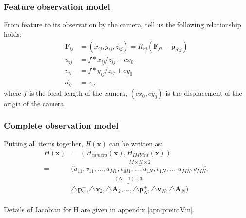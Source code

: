 \documentclass[12pt]{article}   %
\begin{document}
\subsubsection{Feature observation model}
From feature to its observation by the camera, \cite{multipleViewGeometry} tell us the following relationship holds:
\begin{align}
\textbf{F}_{ij} &= (x_{ij}, y_{ij}, z_{ij}) = R_{cj} (\textbf{F}_{fi} - \textbf{p}_{c0j}) \label{formu:pij} \\
u_{ij} &= f * x_{ij} / z_{ij} + cx_0 \label{formu:uij} \\
v_{ij} &= f * y_{ij} / z_{ij} + cy_0 \label{formu:vij} \\
d_{ij} &= z_{ij} \label{formu:dij}
\end{align}
where $f$ is the focal length of the camera, $(cx_0, cy_0)$ is the displacement of the origin of the camera.

\subsubsection{Complete observation model}
Putting all items together, $H(\textbf{x})$ can be written as:
\begin{align} %
H(\textbf{x}) &= (H_{camera}(\textbf{x}), H_{IMUint}(\textbf{x})) \nonumber \\
=& (\overbrace{{u}_{11}, {v}_{11}, ... , {u}_{M1}, {v}_{M1}, ..., {u}_{1N}, {v}_{1N}, ... , {u}_{MN}, {v}_{MN}}^{M \times N \times 2}, \nonumber \nonumber \\ 
& \overbrace{\triangle \textbf{p}^+_{2}, \triangle \textbf{v}_{2}, \triangle \textbf{A}_{2}, ... , \triangle \textbf{p}^+_{N}, \triangle \textbf{v}_{N}, \triangle \textbf{A}_{N}}^{(N-1) \times 9}) 
\end{align}\\
Details of Jacobian for H are given in appendix \ref{apn:preintVin}.
\end{document}
